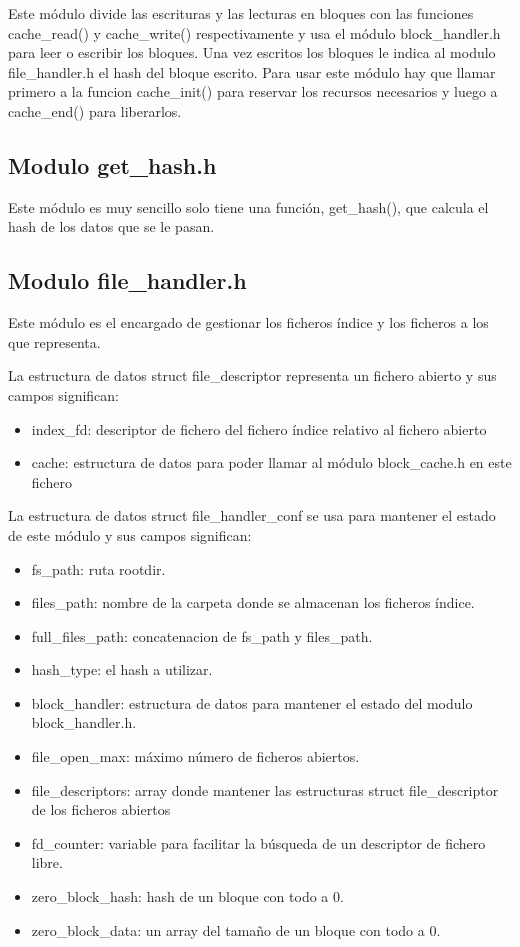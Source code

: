 \documentclass[a4paper,12pt]{article}
\begin{document}
Este módulo divide las escrituras y las lecturas en bloques con las funciones cache\_read() y cache\_write() respectivamente y usa el módulo block\_handler.h para leer o escribir los bloques. Una vez escritos los bloques le indica al modulo file\_handler.h el hash del bloque escrito. Para usar este módulo hay que llamar primero a la funcion cache\_init() para reservar los recursos necesarios y luego a cache\_end() para liberarlos.

\subsection{Modulo get\_hash.h}

Este módulo es muy sencillo solo tiene una función, get\_hash(), que calcula el hash de los datos que se le pasan.

\subsection{Modulo file\_handler.h}

Este módulo es el encargado de gestionar los ficheros índice y los ficheros a los que representa.
\bigskip

La estructura de datos struct file\_descriptor representa un fichero abierto y sus campos significan:
\begin{itemize}
\item index\_fd: descriptor de fichero del fichero índice relativo al fichero abierto
\item cache: estructura de datos para poder llamar al módulo block\_cache.h en este fichero
\end{itemize}




La estructura de datos struct file\_handler\_conf se usa para mantener el estado de este módulo y sus campos significan:

\begin{itemize}
\item fs\_path: ruta rootdir.
\item files\_path: nombre de la carpeta donde se almacenan los ficheros índice.
\item full\_files\_path: concatenacion de fs\_path y files\_path.
\item hash\_type: el hash a utilizar.
\item block\_handler: estructura de datos para mantener el estado del modulo block\_handler.h.
\item file\_open\_max: máximo número de ficheros abiertos.
\item file\_descriptors: array donde mantener las estructuras struct file\_descriptor de los ficheros abiertos
\item fd\_counter: variable para facilitar la búsqueda de un descriptor de fichero libre.
\item zero\_block\_hash: hash de un bloque con todo a 0.
\item zero\_block\_data: un array del tamaño de un bloque con todo a 0.
\end{itemize}
\end{document}
